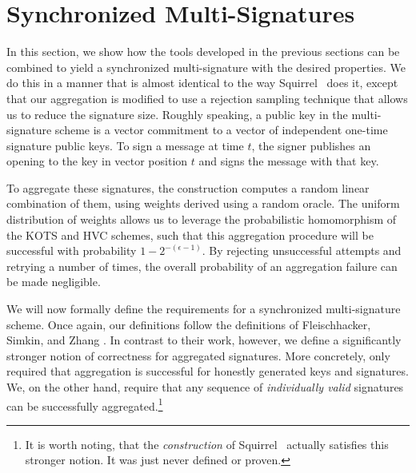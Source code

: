
\section{Synchronized Multi-Signatures}\label{sec:nidv}

In this section, we show how the tools developed in the previous sections can be combined to yield a synchronized multi-signature with the desired properties.
We do this in a manner that is almost identical to the way Squirrel~\cite{CCS:FleSimZha22} does it, except that our aggregation is modified to use a rejection sampling technique that allows us to reduce the signature size.
Roughly speaking, a public key in the multi-signature scheme is a vector commitment to a vector of independent one-time signature public keys.
To sign a message at time $t$, the signer publishes an opening to the key in vector position $t$ and signs the message with that key.

To aggregate these signatures, the construction computes a random linear combination of them, using weights derived using a random oracle.
The uniform distribution of weights allows us to leverage the probabilistic homomorphism of the KOTS and HVC schemes, such that this aggregation procedure will be successful with probability $1-2^{-(\epsilon-1)}$.
By rejecting unsuccessful attempts and retrying a number of times, the overall probability of an aggregation failure can be made negligible.

We will now formally define the requirements for a synchronized multi-signature scheme.
Once again, our definitions follow the definitions of Fleischhacker, Simkin, and Zhang \cite{CCS:FleSimZha22}.
In contrast to their work, however, we define a significantly stronger notion of correctness for aggregated signatures.
More concretely, \cite{CCS:FleSimZha22} only required that aggregation is successful for honestly generated keys and signatures.
We, on the other hand, require that any sequence of \emph{individually valid} signatures can be successfully aggregated.\footnote{It is worth noting, that the  \emph{construction} of Squirrel~\cite{CCS:FleSimZha22} actually satisfies this stronger notion. It was just never defined or proven.}

